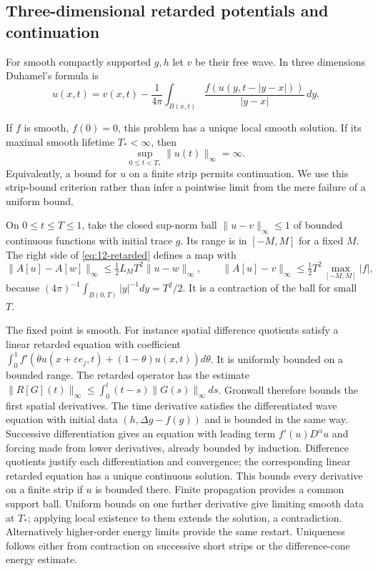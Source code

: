 \subsection{Three-dimensional retarded potentials and continuation}
For smooth compactly supported $g,h$ let $v$ be their free wave.
In three dimensions Duhamel's formula is
\begin{equation}\label{eq:12-retarded}
 u(x,t)=v(x,t)-\frac1{4\pi}\int_{B(x,t)}
 \frac{f(u(y,t-|y-x|))}{|y-x|}\,dy.
\end{equation}
\begin{theorem}
If $f$ is smooth, $f(0)=0$, this problem has a unique local smooth
solution. If its maximal smooth lifetime $T_*<\infty$, then
\[
 \sup_{0\le t<T_*}\|u(t)\|_\infty=\infty.
\]
Equivalently, a bound for $u$ on a finite strip permits continuation.
We use this strip-bound criterion rather than infer a pointwise limit
from the mere failure of a uniform bound.
\end{theorem}
\begin{expandedproof}
On $0\le t\le T\le1$, take the closed sup-norm ball
$\|u-v\|_\infty\le1$ of bounded continuous functions with initial
trace $g$. Its range is in $[-M,M]$ for a fixed $M$.
The right side of \eqref{eq:12-retarded} defines a map with
\[
 \|A[u]-A[w]\|_\infty\le\tfrac12 L_MT^2\|u-w\|_\infty,
 \qquad \|A[u]-v\|_\infty\le\tfrac12 T^2\max_{[-M,M]}|f|,
\]
because $(4\pi)^{-1}\int_{B(0,T)}|y|^{-1}dy=T^2/2$.
It is a contraction of the ball for small $T$.

The fixed point is smooth. For instance spatial difference quotients
satisfy a linear retarded equation with coefficient
$\int_0^1f'(\theta u(x+\varepsilon e_j,t)+(1-\theta)u(x,t))d\theta$.
It is uniformly bounded on a bounded range. The retarded operator
has the estimate
$\|R[G](t)\|_\infty\le\int_0^t(t-s)\|G(s)\|_\infty ds$.
Gronwall therefore bounds the first spatial derivatives. The time
derivative satisfies the differentiated wave equation with initial
data $(h,\Delta g-f(g))$ and is bounded in the same way. Successive
differentiation gives an equation with leading term $f'(u)D^\alpha u$
and forcing made from lower derivatives, already bounded by induction.
Difference quotients justify each differentiation and convergence;
the corresponding linear retarded equation has a unique continuous
solution. This bounds every derivative on a finite strip if $u$ is
bounded there. Finite propagation provides a common support ball.
Uniform bounds on one further derivative give limiting smooth data
at $T_*$; applying local existence to them extends the solution,
a contradiction. Alternatively higher-order energy limits provide
the same restart. Uniqueness follows either from contraction on
successive short strips or the difference-cone energy estimate.
\end{expandedproof}

